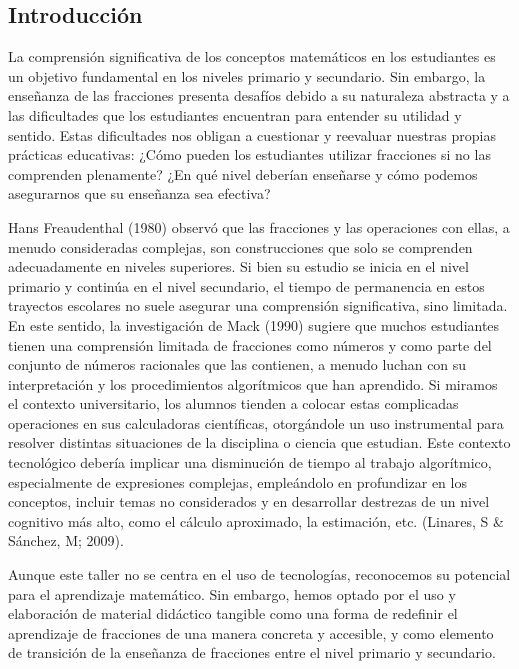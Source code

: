 \subsection{Introducción}

La comprensión significativa de los conceptos matemáticos en los estudiantes es un objetivo fundamental en los niveles primario y secundario. Sin embargo, la enseñanza de las fracciones presenta desafíos debido a su naturaleza abstracta y a las dificultades que los estudiantes encuentran para entender su utilidad y sentido. Estas dificultades nos obligan a cuestionar y reevaluar nuestras propias prácticas educativas: ¿Cómo pueden los estudiantes utilizar fracciones si no las comprenden plenamente? ¿En qué nivel deberían enseñarse y cómo podemos asegurarnos que su enseñanza sea efectiva?

Hans Freaudenthal (1980) observó que las fracciones y las operaciones con ellas, a menudo consideradas complejas, son construcciones que solo se comprenden adecuadamente en niveles superiores. Si bien su estudio se inicia en el nivel primario y continúa en el nivel secundario, el tiempo de permanencia en estos trayectos escolares no suele asegurar una comprensión significativa, sino limitada. En este sentido, la investigación de Mack (1990) sugiere que muchos estudiantes tienen una comprensión limitada de fracciones como números y como parte del conjunto de números racionales que las contienen, a menudo luchan con su interpretación y los procedimientos algorítmicos que han aprendido. Si miramos el contexto universitario, los alumnos tienden a colocar estas complicadas operaciones en sus calculadoras científicas, otorgándole un uso instrumental para resolver distintas situaciones de la disciplina o ciencia que estudian. Este contexto tecnológico debería implicar una disminución de tiempo al trabajo algorítmico, especialmente de expresiones complejas, empleándolo en profundizar en los conceptos, incluir temas no considerados y en desarrollar destrezas de un nivel cognitivo más alto, como el cálculo aproximado, la estimación, etc. (Linares, S \& Sánchez, M; 2009).

Aunque este taller no se centra en el uso de tecnologías, reconocemos su potencial para el aprendizaje matemático. Sin embargo, hemos optado por el uso y elaboración de material didáctico tangible como una forma de redefinir el aprendizaje de fracciones de una manera concreta y accesible, y como elemento de transición de la enseñanza de fracciones entre el nivel primario y secundario.

